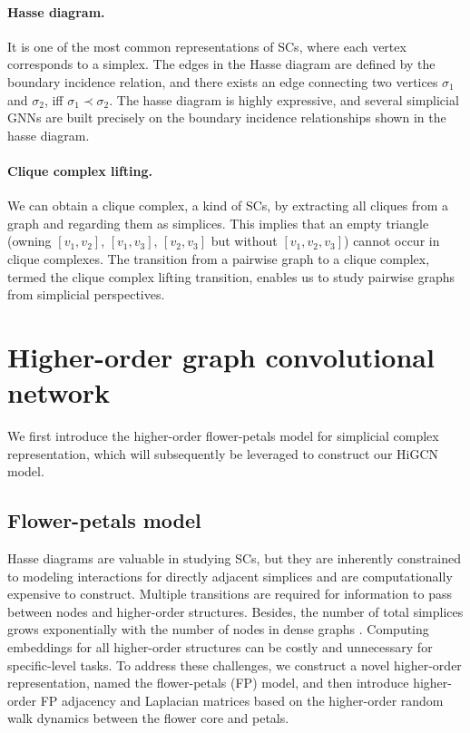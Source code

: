 \documentclass[letterpaper]{article} \usepackage{aaai24}
\theoremstyle{plain}
\theoremstyle{definition}
\theoremstyle{remark}
\begin{document}
\paragraph{Hasse diagram.} It is one of the most common representations of SCs, where each vertex corresponds to a simplex. 
The edges in the Hasse diagram are defined by the boundary incidence relation, and there exists an edge connecting two vertices $\sigma_1$ and $\sigma_2$, iff $\sigma_1 \prec \sigma_2$.
The hasse diagram is highly expressive, and several simplicial GNNs \cite{SCoNe21Roddenberry, SWL2021, GMPS22} are built precisely on the boundary incidence relationships shown in the hasse diagram. 

\paragraph{Clique complex lifting.} 
We can obtain a clique complex, a kind of SCs, by extracting all cliques from a graph and regarding them as simplices. 
This implies that an empty triangle (owning $\left[v_1,v_2\right]$, $\left[v_1,v_3\right]$, $\left[v_2,v_3\right]$ but without $\left[v_1,v_2,v_3\right]$) cannot occur in clique complexes.
The transition from a pairwise graph to a clique complex, termed the clique complex lifting transition, enables us to study pairwise graphs from simplicial perspectives.





\section{Higher-order graph convolutional network}

We first introduce the higher-order flower-petals model for simplicial complex representation, which will subsequently be leveraged to construct our HiGCN model.



\subsection{Flower-petals model}
Hasse diagrams are valuable in studying SCs, but they are inherently constrained to modeling interactions for directly adjacent simplices and are computationally expensive to construct. Multiple transitions are required for information to pass between nodes and higher-order structures.
Besides, the number of total simplices grows exponentially with the number of nodes in dense graphs \cite{maxClique1999}.
Computing embeddings for all higher-order structures can be costly and unnecessary for specific-level tasks. 
To address these challenges, we construct a novel higher-order representation, named the flower-petals (FP) model, and then introduce higher-order FP adjacency and Laplacian matrices based on the higher-order random walk dynamics between the flower core and petals.
\end{document}
